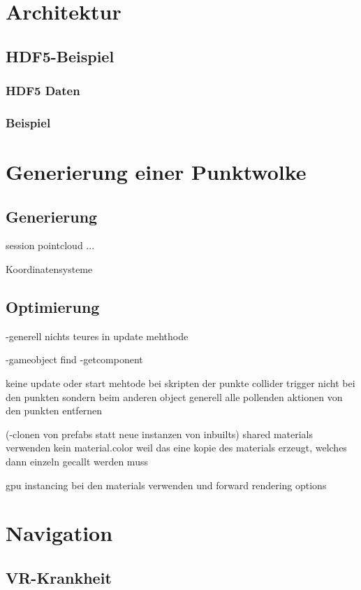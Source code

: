 \section{Architektur}

\subsection{HDF5-Beispiel}
\subsubsection{HDF5 Daten}
\subsubsection{Beispiel}

\section{Generierung einer Punktwolke}
\label{sec:Generierung}

\subsection{Generierung}
session
pointcloud
...

Koordinatensysteme

\subsection{Optimierung}
-generell nichts teures in update mehthode
	
-gameobject find
-getcomponent

keine update oder start mehtode bei skripten der punkte
collider trigger nicht bei den punkten sondern beim anderen object
generell alle pollenden aktionen von den punkten entfernen


(-clonen von prefabs statt neue instanzen von inbuilts)
shared materials verwenden   kein material.color weil das eine kopie des materials erzeugt, welches dann einzeln gecallt werden muss

gpu instancing bei den materials verwenden und forward rendering options

\section{Navigation}
\label{sec:Navigation}
\subsection{VR-Krankheit}
